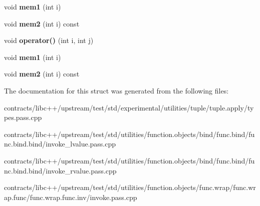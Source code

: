 \begin{DoxyCompactItemize}
void {\bfseries mem1} (int i)
\item 
\mbox{\label{struct_a__void__2_a0df8fe8b4e446556c20ca71b7ffb38e7}} 
void {\bfseries mem2} (int i) const
\item 
\mbox{\label{struct_a__void__2_a0cacba004197ab4fc207314ee5dce531}} 
void {\bfseries operator()} (int i, int j)
\item 
\mbox{\label{struct_a__void__2_a38d83f9a54083c0fc3dd27fe1648a783}} 
void {\bfseries mem1} (int i)
\item 
\mbox{\label{struct_a__void__2_a0df8fe8b4e446556c20ca71b7ffb38e7}} 
void {\bfseries mem2} (int i) const
\end{DoxyCompactItemize}


The documentation for this struct was generated from the following files\+:\begin{DoxyCompactItemize}
\item 
contracts/libc++/upstream/test/std/experimental/utilities/tuple/tuple.\+apply/types.\+pass.\+cpp\item 
contracts/libc++/upstream/test/std/utilities/function.\+objects/bind/func.\+bind/func.\+bind.\+bind/invoke\+\_\+lvalue.\+pass.\+cpp\item 
contracts/libc++/upstream/test/std/utilities/function.\+objects/bind/func.\+bind/func.\+bind.\+bind/invoke\+\_\+rvalue.\+pass.\+cpp\item 
contracts/libc++/upstream/test/std/utilities/function.\+objects/func.\+wrap/func.\+wrap.\+func/func.\+wrap.\+func.\+inv/invoke.\+pass.\+cpp\end{DoxyCompactItemize}

